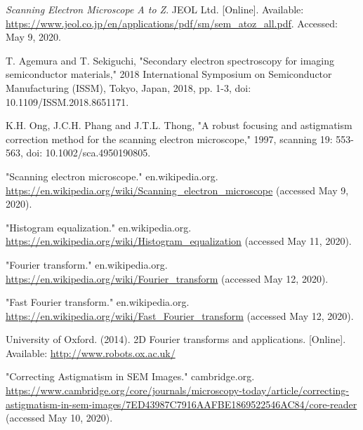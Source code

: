\documentclass{article}
\begin{document}
\newpage
\begin{thebibliography}{}
    \textit{Scanning Electron Microscope A to Z}. JEOL Ltd. [Online]. Available: \url{https://www.jeol.co.jp/en/applications/pdf/sm/sem_atoz_all.pdf}. Accessed: May 9, 2020.

    T. Agemura and T. Sekiguchi, "Secondary electron spectroscopy for imaging semiconductor materials," 2018 International Symposium on Semiconductor Manufacturing (ISSM), Tokyo, Japan, 2018, pp. 1-3, doi: 10.1109/ISSM.2018.8651171.

    K.H. Ong, J.C.H. Phang and J.T.L. Thong, "A robust focusing and astigmatism correction method for the scanning electron microscope," 1997, scanning 19: 553-563, doi: 10.1002/sca.4950190805.
    
    "Scanning electron microscope." en.wikipedia.org. \url{https://en.wikipedia.org/wiki/Scanning_electron_microscope} (accessed May 9, 2020).

    "Histogram equalization." en.wikipedia.org. \url{https://en.wikipedia.org/wiki/Histogram_equalization} (accessed May 11, 2020).

    "Fourier transform." en.wikipedia.org. \url{https://en.wikipedia.org/wiki/Fourier_transform} (accessed May 12, 2020).

    "Fast Fourier transform." en.wikipedia.org. \url{https://en.wikipedia.org/wiki/Fast_Fourier_transform} (accessed May 12, 2020).

    University of Oxford. (2014). 2D Fourier transforms and applications. [Online]. Available: \url{http://www.robots.ox.ac.uk/}

    "Correcting Astigmatism in SEM Images." cambridge.org. \url{https://www.cambridge.org/core/journals/microscopy-today/article/correcting-astigmatism-in-sem-images/7ED43987C7916AAFBE1869522546AC84/core-reader} (accessed May 10, 2020).
\end{thebibliography}
\end{document}
